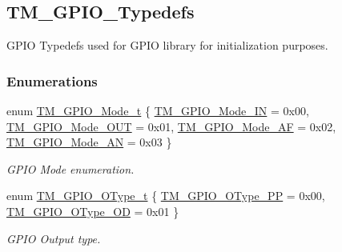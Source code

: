 \hypertarget{group___t_m___g_p_i_o___typedefs}{}\subsection{T\+M\+\_\+\+G\+P\+I\+O\+\_\+\+Typedefs}
\label{group___t_m___g_p_i_o___typedefs}


G\+P\+I\+O Typedefs used for G\+P\+I\+O library for initialization purposes.  


\subsubsection*{Enumerations}
\begin{DoxyCompactItemize}
\item 
enum \hyperlink{group___t_m___g_p_i_o___typedefs_gacbb363a57d0e70ea563e494eff1db3ca}{T\+M\+\_\+\+G\+P\+I\+O\+\_\+\+Mode\+\_\+t} \{ \hyperlink{group___t_m___g_p_i_o___typedefs_ggacbb363a57d0e70ea563e494eff1db3caa4a1a1cac84d610e1498af9207babf8cf}{T\+M\+\_\+\+G\+P\+I\+O\+\_\+\+Mode\+\_\+\+I\+N} = 0x00, 
\hyperlink{group___t_m___g_p_i_o___typedefs_ggacbb363a57d0e70ea563e494eff1db3caa6e5728698978e1610a61c1c3c6fab961}{T\+M\+\_\+\+G\+P\+I\+O\+\_\+\+Mode\+\_\+\+O\+U\+T} = 0x01, 
\hyperlink{group___t_m___g_p_i_o___typedefs_ggacbb363a57d0e70ea563e494eff1db3caaa8f2be5601e2cb483e95b035423054c7}{T\+M\+\_\+\+G\+P\+I\+O\+\_\+\+Mode\+\_\+\+A\+F} = 0x02, 
\hyperlink{group___t_m___g_p_i_o___typedefs_ggacbb363a57d0e70ea563e494eff1db3caa1654d8b26d95020f254506ff9164c07a}{T\+M\+\_\+\+G\+P\+I\+O\+\_\+\+Mode\+\_\+\+A\+N} = 0x03
 \}
\begin{DoxyCompactList}\small\item\em G\+P\+I\+O Mode enumeration. \end{DoxyCompactList}\item 
enum \hyperlink{group___t_m___g_p_i_o___typedefs_ga1d443fe266a4073f40ea271ae7b8df9f}{T\+M\+\_\+\+G\+P\+I\+O\+\_\+\+O\+Type\+\_\+t} \{ \hyperlink{group___t_m___g_p_i_o___typedefs_gga1d443fe266a4073f40ea271ae7b8df9fab1326cfb732c83fde91b8910de64465f}{T\+M\+\_\+\+G\+P\+I\+O\+\_\+\+O\+Type\+\_\+\+P\+P} = 0x00, 
\hyperlink{group___t_m___g_p_i_o___typedefs_gga1d443fe266a4073f40ea271ae7b8df9fa075f8c992f11c2379570a5a2deb2061c}{T\+M\+\_\+\+G\+P\+I\+O\+\_\+\+O\+Type\+\_\+\+O\+D} = 0x01
 \}
\begin{DoxyCompactList}\small\item\em G\+P\+I\+O Output type. \end{DoxyCompactList}\item 

\end{DoxyCompactItemize}
